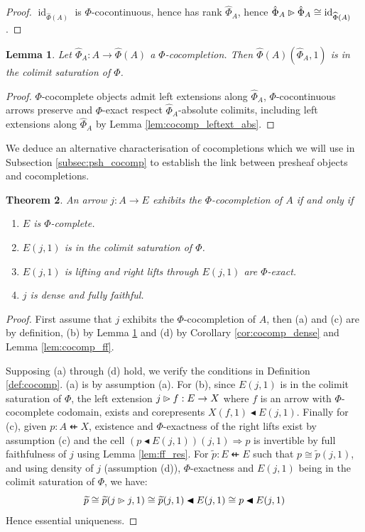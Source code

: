 \documentclass[10pt,a4paper]{article}
\newcommand{\To}{\Rightarrow}
\newcommand{\coce}[2]{{\hat{#1}}_{#2}}
\newcommand{\coc}[2]{{\widehat{#1}}(#2)}
\newcommand{\dfrom}{\nvleftarrow}
\newcommand{\plext}{\mathbin{{\rhd}\mathclap{\mspace{-17.5mu}\cdot}}}
\newcommand{\rift}{\mathbin{\blacktriangleleft}}
\newcommand{\simeqq}{\cong}
\DeclareMathOperator{\id}{id}
\theoremstyle{plain}
\newtheorem{theorem}{Theorem}[subsection]
\newtheorem{lemma}[theorem]{Lemma}
\theoremstyle{definition}
\theoremstyle{remark}
\begin{document}
\begin{proof}
    $\id_{\coc\Phi A}$ is $\Phi$-cocontinuous, hence has rank $\coce\Phi A$, hence $\coce\Phi A \plext \coce\Phi A \simeqq \id_{\coc\Phi A}$.
\end{proof}

\begin{lemma}
    \label{lem:cocomp_colimsat}
    Let $\coce\Phi A : A \to \coc\Phi A$ a $\Phi$-cocompletion. Then $\coc\Phi A(\coce\Phi A, 1)$ is in the colimit saturation of $\Phi$.
\end{lemma}

\begin{proof}
    $\Phi$-cocomplete objects admit left extensions along $\coce\Phi A$, $\Phi$-cocontinuous arrows preserve and $\Phi$-exact respect $\coce\Phi A$-absolute colimits, including left extensions along $\coce\Phi A$ by Lemma \ref{lem:cocomp_leftext_abs}.
\end{proof}

We deduce an alternative characterisation of cocompletions which we will use in Subsection \ref{subsec:psh_cocomp} to establish the link between presheaf objects and cocompletions.

\begin{theorem}
    \label{th:cocomp_chararct}
    An arrow $j : A \to E$ exhibits the $\Phi$-cocompletion of $A$ if and only if
    \begin{enumerate}
        \item $E$ is $\Phi$-complete.
        \item $E(j, 1)$ is in the colimit saturation of $\Phi$.
        \item $E(j, 1)$ is lifting and right lifts through $E(j, 1)$ are $\Phi$-exact.
        \item $j$ is dense and fully faithful.
    \end{enumerate}
\end{theorem}

\begin{proof}
    First assume that $j$ exhibits the $\Phi$-cocompletion of $A$, then (a) and (c) are by definition, (b) by Lemma \ref{lem:cocomp_colimsat} and (d) by Corollary \ref{cor:cocomp_dense} and Lemma \ref{lem:cocomp_ff}.

    Supposing (a) through (d) hold, we verify the conditions in Definition \ref{def:cocomp}. (a) is by assumption (a). For (b), since $E(j, 1)$ is in the colimit saturation of $\Phi$, the left extension $j \plext f : E \to X$ where $f$ is an arrow with $\Phi$-cocomplete codomain, exists and corepresents $X(f, 1)\rift E(j, 1)$. Finally for (c), given $p : A \dfrom X$, existence and $\Phi$-exactness of the right lifts exist by assumption (c) and the cell $(p\rift E(j, 1))(j, 1)\To p$ is invertible by full faithfulness of $j$ using Lemma \ref{lem:ff_res}. For $\widetilde p : E \dfrom E$ such that $p \simeqq \widetilde{p}(j, 1)$, and using density of $j$ (assumption (d)),  $\Phi$-exactness and $E(j, 1)$ being in the colimit saturation of $\Phi$, we have:
    $$\widetilde p \simeqq \widetilde{p}(j\plext j, 1) \simeqq \widetilde{p}(j, 1) \rift E(j, 1) \simeqq p\rift E(j, 1)$$
    Hence essential uniqueness.
\end{proof}
\end{document}
